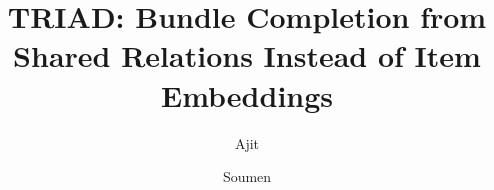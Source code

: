 \documentclass[runningheads]{llncs}
\begin{document}
\title{TRIAD: Bundle Completion from Shared Relations Instead of Item Embeddings}
\author{Ajit \and Soumen}
\institute{}  %
\maketitle

\begin{abstract}

\end{abstract}
\end{document}
